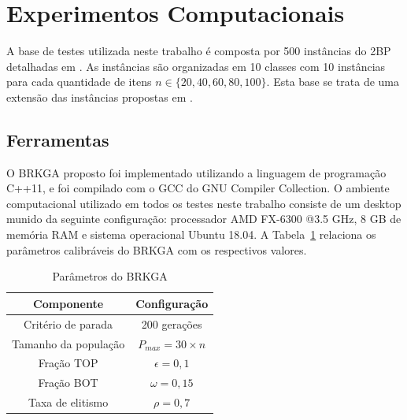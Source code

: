 \documentclass[article]{rian_article}
\begin{document}
\section{Experimentos Computacionais}
A base de testes utilizada neste trabalho é composta por 500 instâncias do 2BP detalhadas em \citet{martello1998}. As instâncias são organizadas em 10 classes com 10 instâncias para cada quantidade de itens ${n} \in \{20, 40, 60, 80, 100\}$. Esta base se trata de uma extensão das instâncias propostas em \citet{wang1987}.

\subsection{Ferramentas}\label{sec::ferramentas}

O BRKGA proposto foi implementado utilizando a linguagem de programação C++11, e foi compilado com o GCC do GNU Compiler Collection. O ambiente computacional utilizado em todos os testes neste trabalho consiste de um desktop munido da seguinte configuração: processador AMD FX-6300 @3.5 GHz, 8 GB de memória RAM e sistema operacional Ubuntu 18.04. A Tabela~\ref{tab:params} relaciona os parâmetros calibráveis do BRKGA com os respectivos valores.

\begin{table}[htb]
	\caption{Parâmetros do BRKGA}
	\label{tab:params}
	\centering
	\footnotesize
	\begin{tabular}{|c|c|}
		\hline
		Componente               &Configuração \\ \hline
		Critério de parada       &200 gerações	 \\ \hline
		Tamanho da população     &$P_{max} = 30 \times {n}$	 \\ \hline
		Fração TOP               &$\epsilon = 0,1$	 \\ \hline
		Fração BOT               &$\omega = 0,15$	 \\ \hline
		Taxa de elitismo         &$\rho = 0,7$	 \\ \hline
	\end{tabular}
\end{table}
\end{document}

